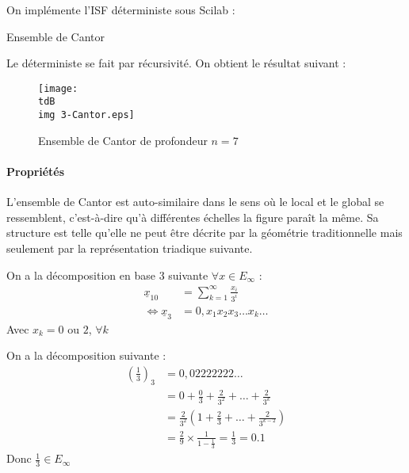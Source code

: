 			On implémente l'ISF déterministe sous Scilab :
			\begin{listing}[H]
				\caption{Ensemble de Cantor}
				\label{code-2-cantor}
			\end{listing}

			Le déterministe se fait par récursivité. On obtient le résultat suivant :
			\begin{figure}[H]
				\centering
				\texttt{[image: \\tdB\\img 3-Cantor.eps]}
				\caption{Ensemble de Cantor de profondeur $n=7$}
				\label{img-2-cantor}
			\end{figure}


		\paragraph{Propriétés}

			L'ensemble de Cantor est auto-similaire dans le sens où le local et le global se ressemblent, c'est-à-dire qu'à différentes échelles la figure paraît la même. 
			Sa structure est telle qu'elle ne peut être décrite par la géométrie traditionnelle mais seulement par la représentation triadique suivante.

			\begin{theoreme}
				On a la décomposition en base 3 suivante $\forall x \in E_\infty$ :
				\begin{align}
					\label{eq-2-cantorDecomposition}				
					\underline{x}_{10}	&= \sum_{k=1}^\infty \frac{x_i}{3^i}	\\
				\iff\underline{x}_{3} 	&= 0,x_1x_2x_3\ldots x_k\ldots
				\end{align}
				Avec $x_k = 0$ ou $2$, $\forall k$
			\end{theoreme}
			\begin{ex}
				On a la décomposition suivante :
				\begin{align*}
					\left(\frac{1}{3}\right)_3 	& = 0,02222222\ldots	\\
												& = 0 + \frac{0}{3} + \frac{2}{3^2} + \ldots + \frac{2}{3^k}	\\
												& = \frac{2}{3^2} \left(1 + \frac{2}{3} + \ldots +\frac{2}{3^{k-2}}\right)	\\
												& = \frac{2}{9} \times \frac{1}{1-\frac{1}{3}} = \frac{1}{3} = 0.1
				\end{align*}
				Donc $\frac{1}{3} \in E_\infty $
			\end{ex}

